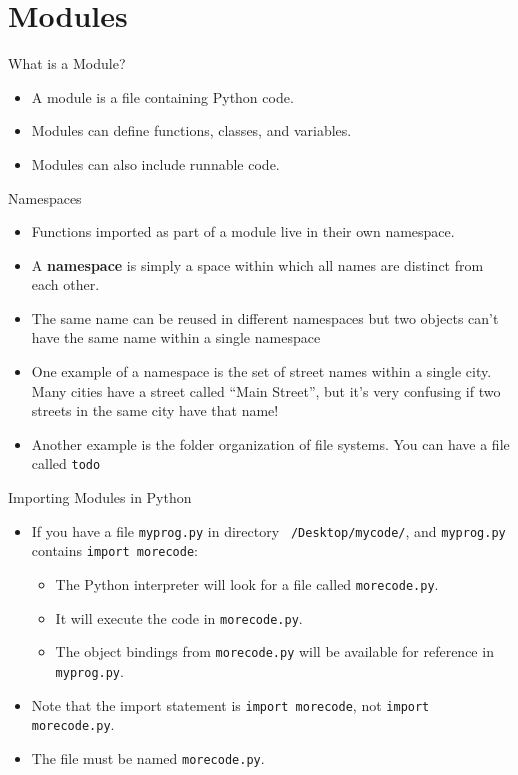 \section{Modules}
\begin{frame}{What is a Module?}
    \begin{itemize}
        \item A module is a file containing Python code.
        \item Modules can define functions, classes, and variables.
        \item Modules can also include runnable code.
    \end{itemize}
\end{frame}

\begin{frame}{Namespaces}
    \begin{itemize}
    \item Functions imported as part of a module live in their own namespace. 
    \item A \textbf{namespace} is simply a space within which all names are distinct from each other. 
    \item The same name can be reused in different namespaces but two objects can’t have the same name within a single namespace
    \item One example of a namespace is the set of street names within a single city. Many cities have a street called “Main Street”, but it’s very confusing if two streets in the same city have that name!
    \item Another example is the folder organization of file systems. You can have a file called \texttt{todo} \end{itemize}
\end{frame}


\begin{frame}{Importing Modules in Python}
    \begin{itemize}
        \item If you have a file \texttt{myprog.py} in directory \texttt{~/Desktop/mycode/}, and \texttt{myprog.py} contains \texttt{import morecode}:
        \begin{itemize}
            \item The Python interpreter will look for a file called \texttt{morecode.py}.
            \item It will execute the code in \texttt{morecode.py}.
            \item The object bindings from \texttt{morecode.py} will be available for reference in \texttt{myprog.py}.
        \end{itemize}
        \item Note that the import statement is \texttt{import morecode}, not \texttt{import morecode.py}.
        \item The file must be named \texttt{morecode.py}.
    \end{itemize}
\end{frame}

